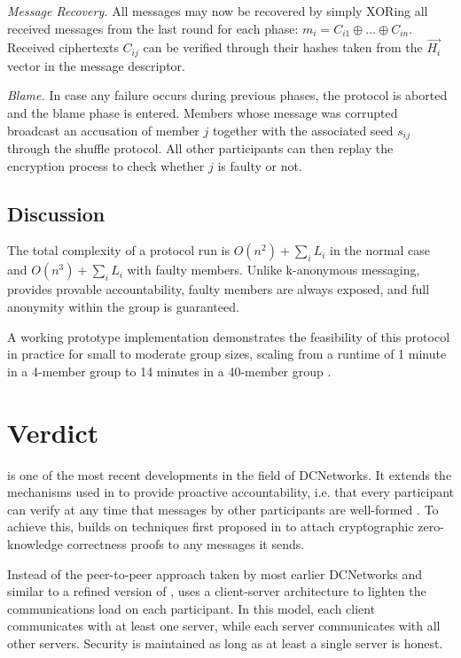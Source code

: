 \emph{Message Recovery.}
      All messages may now be recovered by simply XORing all received messages from the last round for each phase: $m_i = C_{i1} \oplus \ldots \oplus C_{in}$. Received ciphertexts $C_{ij}$ can be verified
      through their hashes taken from the $\vec{H_i}$ vector in the message descriptor.

\emph{Blame.}
      In case any failure occurs during previous phases, the protocol is aborted and the blame phase is entered.
      Members whose message was corrupted broadcast an accusation of member $j$ together with the
      associated seed $s_{ij}$ through the shuffle protocol.
      All other participants can then replay the encryption process to check whether $j$
      is faulty or not.

\subsection{Discussion}
The total complexity of a protocol run is $O(n^2) + \sum_i L_i$ in the normal case
and $O(n^3) + \sum_i L_i$ with faulty members. Unlike k-anonymous messaging,
\Dissent provides provable accountability, faulty members are always exposed, and full anonymity
within the group is guaranteed.

A working prototype implementation demonstrates the feasibility of this protocol in practice
for small to moderate group sizes, scaling from a runtime of 1 minute in a 4-member group
to 14 minutes in a 40-member group \cite{journals/corr/abs-1004-3057}.

\section{Verdict} \label{sec:verdict}

\Verdict is one of the most recent developments in the field of \acp{DCNetwork}.
It extends the mechanisms used in \Dissent to provide proactive accountability, i.e.
that every participant can verify at any time that messages by other participants are well-formed \cite{corrigan2013proactively}. To achieve this, \Verdict builds on techniques first proposed in \cite{juels2004dining} to attach cryptographic zero-knowledge correctness proofs to any messages it sends.

Instead of the peer-to-peer approach taken by most earlier \acp{DCNetwork}
and similar to a refined version of \Dissent \cite{wolinsky2012dissent},
\Verdict uses a client-server architecture to lighten the communications load
on each participant. In this model, each client communicates with at least one server,
while each server communicates with all other servers. Security
is maintained as long as at least a single server is honest.

